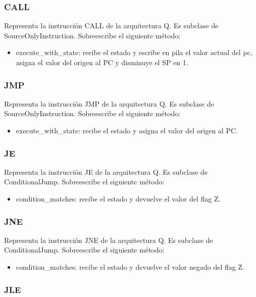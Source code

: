 \subsubsection{CALL}
Representa la instrucción CALL de la arquitectura Q. Es subclase de SourceOnlyInstruction. Sobreescribe el siguiente método:
\begin{itemize}
\item execute\_with\_state: recibe el estado y escribe en pila el valor actual del pc, asigna el valor del origen al PC y disminuye el SP en 1.
\end{itemize}

\subsubsection{JMP}
Representa la instrucción JMP de la arquitectura Q. Es subclase de SourceOnlyInstruction. Sobreescribe el siguiente método:
\begin{itemize}
\item execute\_with\_state: recibe el estado y asigna el valor del origen al PC.
\end{itemize}




\subsubsection{JE}
Representa la instrucción JE de la arquitectura Q. Es subclase de ConditionalJump. Sobreescribe el siguiente método:
\begin{itemize}
\item condition\_matches: recibe el estado y devuelve el valor del flag Z.
\end{itemize}

\subsubsection{JNE}
Representa la instrucción JNE de la arquitectura Q. Es subclase de ConditionalJump. Sobreescribe el siguiente método:
\begin{itemize}
\item condition\_matches: recibe el estado y devuelve el valor negado del flag Z.
\end{itemize}

\subsubsection{JLE}
\label{subsubsec:jle}

